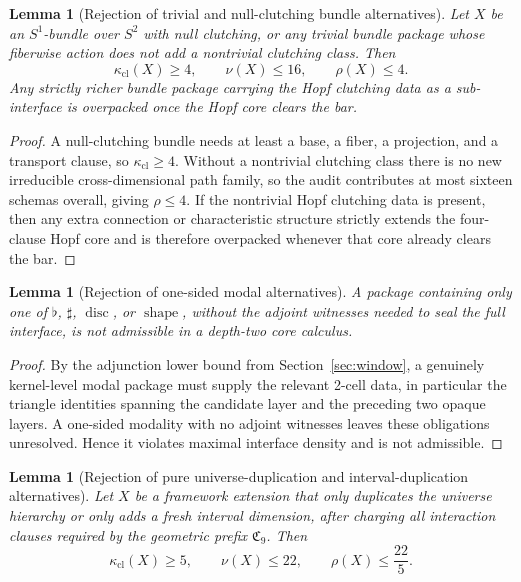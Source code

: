 \documentclass{lmcs}
\theoremstyle{plain}
\newtheorem{lem}[thm]{Lemma}
\theoremstyle{definition}
\theoremstyle{remark}
\newcommand{\Core}{\ensuremath{\mathfrak{C}}}
\newcommand{\disc}{\ensuremath{\operatorname{disc}}}
\newcommand{\shape}{\ensuremath{\operatorname{shape}}}
\newcommand{\sharpm}{\ensuremath{\mathbin{\sharp}}}
\begin{document}
\begin{lem}[Rejection of trivial and null-clutching bundle alternatives]
\label{lem:reject-bundles}
Let $X$ be an $S^1$-bundle over $S^2$ with null clutching, or any trivial bundle package whose fiberwise action does not add a nontrivial clutching class.
Then
\[
  \kappa_{\mathrm{cl}}(X)\ge 4,\qquad \nu(X)\le 16,\qquad \rho(X)\le 4.
\]
Any strictly richer bundle package carrying the Hopf clutching data as a sub-interface is overpacked once the Hopf core clears the bar.
\end{lem}

\begin{proof}
A null-clutching bundle needs at least a base, a fiber, a projection, and a transport clause, so $\kappa_{\mathrm{cl}}\ge 4$.
Without a nontrivial clutching class there is no new irreducible cross-dimensional path family, so the audit contributes at most sixteen schemas overall, giving $\rho\le 4$.
If the nontrivial Hopf clutching data is present, then any extra connection or characteristic structure strictly extends the four-clause Hopf core and is therefore overpacked whenever that core already clears the bar.
\end{proof}

\begin{lem}[Rejection of one-sided modal alternatives]
\label{lem:reject-onesided-modal}
A package containing only one of $\flat$, $\sharpm$, $\disc$, or $\shape$, without the adjoint witnesses needed to seal the full interface, is not admissible in a depth-two core calculus.
\end{lem}

\begin{proof}
By the adjunction lower bound from Section~\ref{sec:window}, a genuinely kernel-level modal package must supply the relevant 2-cell data, in particular the triangle identities spanning the candidate layer and the preceding two opaque layers.
A one-sided modality with no adjoint witnesses leaves these obligations unresolved.
Hence it violates maximal interface density and is not admissible.
\end{proof}

\begin{lem}[Rejection of pure universe-duplication and interval-duplication alternatives]
\label{lem:reject-duplication}
Let $X$ be a framework extension that only duplicates the universe hierarchy or only adds a fresh interval dimension, after charging all interaction clauses required by the geometric prefix $\Core_9$.
Then
\[
  \kappa_{\mathrm{cl}}(X)\ge 5,\qquad \nu(X)\le 22,\qquad \rho(X)\le \frac{22}{5}.
\]
\end{lem}
\end{document}

